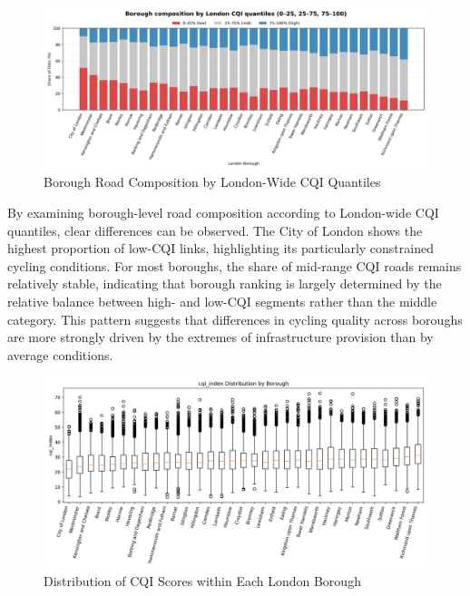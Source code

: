\documentclass[
  12pt,
  oneside]{book}
\begin{document}
\begin{figure}

{\centering \includegraphics[width=0.95\linewidth]{general_images/BoroughComposition} 

}

\caption{Borough Road Composition by London-Wide CQI Quantiles}\label{fig:BoroughComposition}
\end{figure}

By examining borough-level road composition according to London-wide CQI quantiles, clear differences can be observed. The City of London shows the highest proportion of low-CQI links, highlighting its particularly constrained cycling conditions. For most boroughs, the share of mid-range CQI roads remains relatively stable, indicating that borough ranking is largely determined by the relative balance between high- and low-CQI segments rather than the middle category. This pattern suggests that differences in cycling quality across boroughs are more strongly driven by the extremes of infrastructure provision than by average conditions.

\begin{figure}

{\centering \includegraphics[width=0.95\linewidth]{general_images/box_cqi_by_borough} 

}

\caption{Distribution of CQI Scores within Each London Borough}\label{fig:boxcqiborough}
\end{figure}
\end{document}
